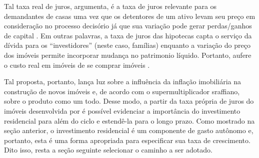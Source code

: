 Tal taxa real de juros, argumenta, é a taxa de juros relevante para os demandantes de casas uma vez que os detentores de um ativo levam seu preço em consideração no processo decisório já que sua variação pode gerar perdas/ganhos de capital \cite[p.~144]{teixeira_crescimento_2015}.
Em outras palavras, a taxa de juros das hipotecas capta o serviço da dívida para os ``investidores'' (neste caso, famílias) enquanto a variação do preço dos imóveis permite incorporar mudança no patrimonio líquido. Portanto, aufere o custo real em imóveis de se comprar imóveis \cite[p.~53]{teixeira_crescimento_2015}. 

Tal proposta, portanto, lança luz sobre a influência da inflação imobiliária na construção de novos imóveis e, de acordo com o supermultiplicador sraffiano, sobre o produto como um todo. 
Desse modo, a partir da taxa própria de juros do imóveis desenvolvida por \textcite{teixeira_crescimento_2015} é possível evidenciar a importância do investimento residencial para além do ciclo e estendê-la para o longo prazo.  
Como mostrado na seção anterior, o investimento residencial é um componente de gasto autônomo e, portanto,
esta é uma forma apropriada para especificar sua taxa de crescimento.
Dito isso, resta a seção seguinte selecionar o caminho a ser adotado.



